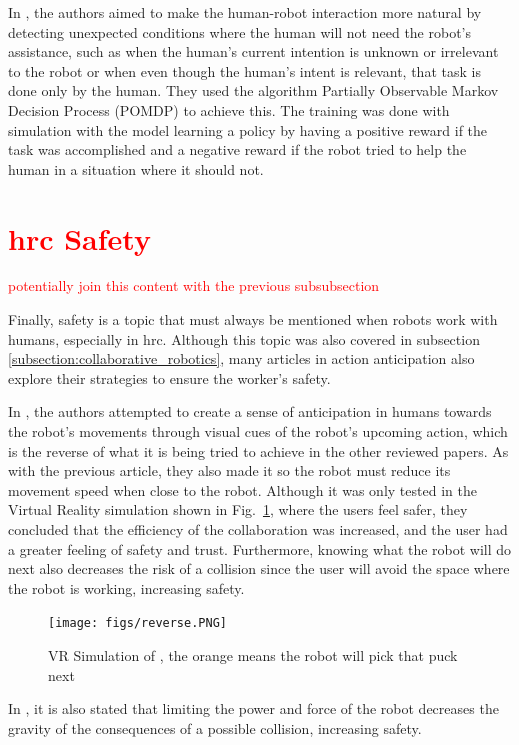 In \textcite{Gorur2018}, the authors aimed to make the human-robot interaction more natural by detecting unexpected conditions where the human will not need the robot's assistance, such as when the human's current intention is unknown or irrelevant to the robot or when even though the human's intent is relevant, that task is done only by the human. They used the algorithm Partially Observable Markov Decision Process (POMDP) to achieve this. The training was done with simulation with the model learning a policy by having a positive reward if the task was accomplished and a negative reward if the robot tried to help the human in a situation where it should not.

\section{\textcolor{red}{\acl{hrc} Safety}}

\textcolor{red}{potentially join this content with the previous subsubsection}

Finally, safety is a topic that must always be mentioned when robots work with humans, especially in \acs{hrc}. Although this topic was also covered in subsection \ref{subsection:collaborative_robotics}, many articles in action anticipation also explore their strategies to ensure the worker's safety.

In \cite{Psarakis2022}, the authors attempted to create a sense of anticipation in humans towards the robot's movements through visual cues of the robot's upcoming action, which is the reverse of what it is being tried to achieve in the other reviewed papers. As with the previous article, they also made it so the robot must reduce its movement speed when close to the robot. Although it was only tested in the Virtual Reality simulation shown in Fig.~\ref{vr}, where the users feel safer, they concluded that the efficiency of the collaboration was increased, and the user had a greater feeling of safety and trust. Furthermore, knowing what the robot will do next also decreases the risk of a collision since the user will avoid the space where the robot is working, increasing safety.

\begin{figure}[!ht]
\centerline{\texttt{[image: figs/reverse.PNG]}}
\caption{VR Simulation of \cite{Psarakis2022}, the orange means the robot will pick that puck next}
\label{vr}
\end{figure}

In \cite{Mukherjee2022}, it is also stated that limiting the power and force of the robot decreases the gravity of the consequences of a possible collision, increasing safety.
\fi